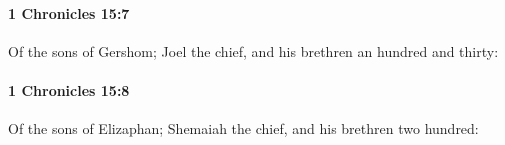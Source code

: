 		\paragraph{1 Chronicles 15:7} %
			\label{1CHRONICLES-15-7}

			Of the sons of Gershom; Joel the chief, and his brethren an hundred and thirty:


		\paragraph{1 Chronicles 15:8} %
			\label{1CHRONICLES-15-8}

			Of the sons of Elizaphan; Shemaiah the chief, and his brethren two hundred:


